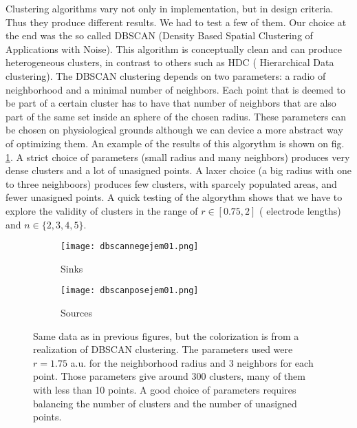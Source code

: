 \documentclass{article}
\begin{document}
Clustering algorithms vary not only in implementation, but in design criteria.
Thus they produce different results. We had to test a few of them. Our choice at the
end was the so called DBSCAN (Density Based Spatial Clustering of Applications with Noise).
This algorithm is conceptually clean and can produce heterogeneous clusters, in contrast
to others such as HDC ( Hierarchical Data clustering). The DBSCAN clustering depends
on two parameters: a radio of neighborhood and a minimal number of neighbors. Each
point that is deemed to be part of a certain cluster has to have that number of neighbors
that are also part of the same set inside an sphere of the chosen radius. These
parameters can be chosen on physiological grounds although we can device a more
abstract way of optimizing them. An example of the results of this
algorythm is shown on fig. \ref{puntoscluster}.
A strict choice of parameters (small radius and many neighbors) produces
very dense clusters and a lot of unasigned points. A laxer choice (a big radius
with one to three neighboors) produces few clusters, with sparcely populated
areas,  and fewer unasigned points. A quick testing of the algorythm 
shows that we have to explore the validity of clusters in the range of
$r \in [0.75, 2 ]$ ( electrode lengths) and $ n \in \lbrace 2,3,4,5 \rbrace$.


\begin{figure}[h]
\centering
\begin{subfigure}{0.40\textwidth}
\texttt{[image: dbscannegejem01.png]}
\caption{Sinks}
\end{subfigure}
\begin{subfigure}{0.40\textwidth}
\texttt{[image: dbscanposejem01.png]}
\caption{Sources}
\end{subfigure}

\caption{Same data as in previous figures, but the colorization is
  from a realization of DBSCAN clustering. The parameters used were
  $r=1.75$ a.u. for the neighborhood radius and 3 neighbors for each point.
  Those parameters give around 300 clusters, many of them with less than
  10 points. A good choice of parameters requires balancing
  the number of clusters and the number of unasigned points. 
}\label{puntoscluster}


\end{figure}
\end{document}
